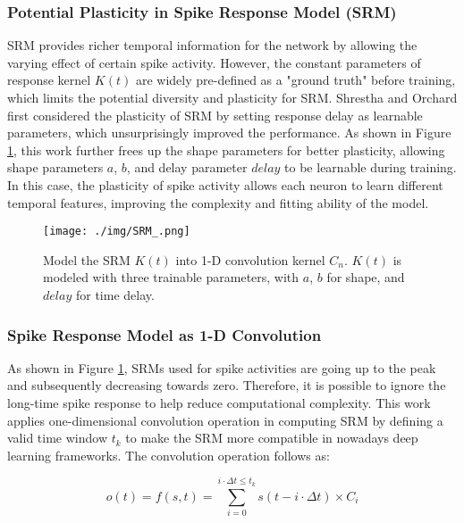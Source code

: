 \documentclass{article}
\begin{document}
\subsubsection{Potential Plasticity in Spike Response Model (SRM)}
SRM provides richer temporal information for the network by allowing the varying effect of certain spike activity. However, the constant parameters of response kernel $K(t)$ are widely pre-defined as a "ground truth" before training, which limits the potential diversity and plasticity for SRM. Shrestha and Orchard  first considered the plasticity of SRM by setting response delay as learnable parameters, which unsurprisingly improved the performance. As shown in Figure \ref{fig:SRM}, this work further frees up the shape parameters for better plasticity, allowing shape parameters $a$, $b$, and delay parameter $delay$ to be learnable during training. In this case, the plasticity of spike activity allows each neuron to learn different temporal features, improving the complexity and fitting ability of the model.




\begin{figure}[htbp]
    \centering
    \texttt{[image: ./img/SRM\_.png]}
    \caption{Model the SRM $K(t)$ into 1-D convolution kernel $C_n$. $K(t)$ is modeled with three trainable parameters, with $a$, $b$ for shape, and $delay$ for time delay.}
    \label{fig:SRM}
\end{figure}

\subsubsection{Spike Response Model as 1-D Convolution}
As shown in Figure \ref{fig:SRM}, SRMs used for spike activities are going up to the peak and subsequently decreasing towards zero.
Therefore, it is possible to ignore the long-time spike response to help reduce computational complexity. This work applies one-dimensional convolution operation in computing SRM by defining a valid time window $t_k$ to make the SRM more compatible in nowadays deep learning frameworks. The convolution operation follows as:





\begin{equation}
    o\left( t \right) = f(s,t) = {\sum\limits^{i\cdot \Delta t \leq t_k}_{i=0}{s\left( t-i\cdot \Delta t \right) \times C_i}}
    \label{eq:conv_syn}
\end{equation}
\end{document}
